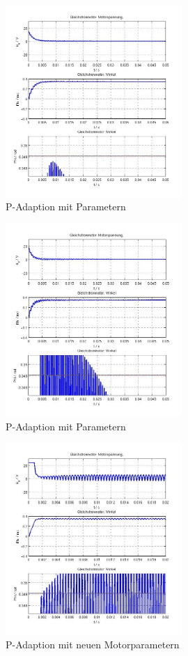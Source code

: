 \begin{figure}[ht]
	\centering
	\includegraphics[width=0.6\textwidth]{Pad-P41F1_1,5F2_80.jpg}
	\caption{P-Adaption mit Parametern}
	\label{padp41f1580}
\end{figure}


\begin{figure}[ht]
	\centering
	\includegraphics[width=0.6\textwidth]{Pad-P50F1_3F2_400.jpg}
	\caption{P-Adaption mit Parametern}
	\label{padp50f3400}
\end{figure}


\begin{figure}[ht]
	\centering
	\includegraphics[width=0.6\textwidth]{Pad-Werte-P330F1_5F2_370.jpg}
	\caption{P-Adaption mit neuen Motorparametern}
	\label{padwerte}
\end{figure}


